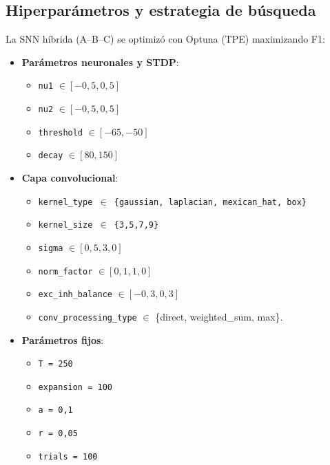 

\subsection{Hiperparámetros y estrategia de búsqueda}
La SNN híbrida (A--B--C) se optimizó con Optuna (TPE) maximizando F1:
\begin{itemize}
    \item \textbf{Parámetros neuronales y STDP}:
    \begin{itemize}
        \item \texttt{nu1} \(\in [-0{,}5, 0{,}5]\)
        \item \texttt{nu2} \(\in [-0{,}5, 0{,}5]\)
        \item \texttt{threshold} \(\in [-65, -50]\)
        \item \texttt{decay} \(\in [80, 150]\)
    \end{itemize}
    \item \textbf{Capa convolucional}:
    \begin{itemize}
        \item \texttt{kernel\_type \(\in\) \{gaussian, laplacian, mexican\_hat, box\}}
        \item \texttt{kernel\_size \(\in\) \{3,5,7,9\}}
        \item \texttt{sigma} \(\in [0{,}5, 3{,}0]\)
        \item \texttt{norm\_factor} \(\in [0{,}1, 1{,}0]\)
        \item \texttt{exc\_inh\_balance} \(\in [-0{,}3, 0{,}3]\)
        \item \texttt{conv\_processing\_type} \(\in\) \{direct, weighted\_sum, max\}.
    \end{itemize}
    \item \textbf{Parámetros fijos}: 
     \begin{itemize}
        \item  \texttt{T = 250}
        \item \texttt{expansion = 100}
        \item \texttt{a = 0{,}1}
        \item \texttt{r = 0{,}05}
        \item \texttt{trials = 100}
    \end{itemize}
\end{itemize}


